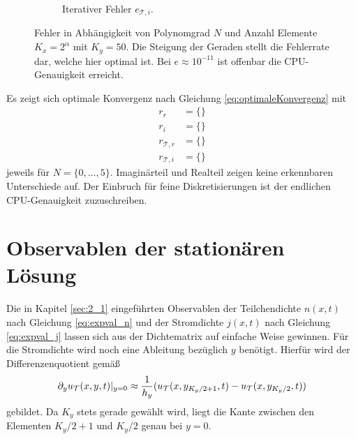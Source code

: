 \begin{figure}
\begin{subfigure}[b]{0.475\textwidth}
        \caption[]%
        {{\small Iterativer Fehler $e_{\mathcal{T},i}$.}}
    \end{subfigure}
    \caption[]
    {Fehler in Abhängigkeit von Polynomgrad $N$ und Anzahl Elemente $K_x=2^{\alpha}$ mit $K_y=50$. Die Steigung der Geraden stellt die Fehlerrate dar, welche hier optimal ist. Bei $e\approx10^{-11}$ ist offenbar die CPU-Genauigkeit erreicht.}
    \label{fig:testResult}
\end{figure}
Es zeigt sich optimale Konvergenz nach Gleichung \eqref{eq:optimaleKonvergenz} mit
\begin{align*}
  r_r &= \{\} \\
  r_i &= \{\} \\
  r_{\mathcal{T},r} &= \{\} \\
  r_{\mathcal{T},i} &= \{\}
\end{align*}
jeweils für $N=\{0,\dots,5\}$. Imaginärteil und Realteil zeigen keine erkennbaren Unterschiede auf. Der Einbruch für feine Diskretisierungen ist der endlichen CPU-Genauigkeit zuzuschreiben.

\section{Observablen der stationären Lösung}\label{sec:IV}
Die in Kapitel \ref{sec:2_1} eingeführten Observablen der Teilchendichte $n(x,t)$ nach Gleichung \eqref{eq:expval_n} und der Stromdichte $j(x,t)$ nach Gleichung \eqref{eq:expval_j} lassen sich aus der Dichtematrix auf einfache Weise gewinnen. Für die Stromdichte wird noch eine Ableitung bezüglich $y$ benötigt. Hierfür wird der Differenzenquotient gemäß
\begin{equation}
  \partial_y u_{\mathcal{T}}(x,y,t)|_{y=0} \approx\frac{1}{h_y}(u_{\mathcal{T}}(x,y_{K_y/2+1},t)-u_{\mathcal{T}}(x,y_{K_y/2},t))
  \label{eq:ableitung_y}
\end{equation}
gebildet. Da $K_y$ stets gerade gewählt wird, liegt die Kante zwischen den Elementen $K_y/2+1$ und $K_y/2$ genau bei $y=0$.

